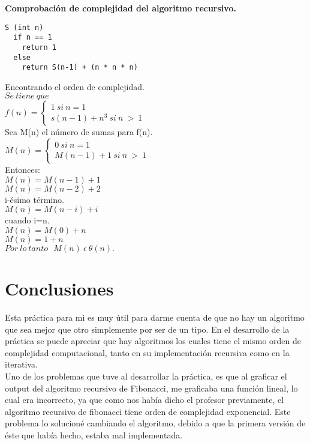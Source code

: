 \documentclass[12pt]{report}
\begin{document}
	\textbf{Comprobación de complejidad del algoritmo recursivo.} \\
	\lstset{language=C, breaklines=true, basicstyle=\footnotesize}
	\lstset{numbers=left, numberstyle=\tiny, stepnumber=1, numbersep=10pt}
	\begin{lstlisting}
S (int n)
  if n == 1
    return 1
  else
    return S(n-1) + (n * n * n)
	\end{lstlisting}

	Encontrando el orden de complejidad.\\		
	$Se \ tiene \ que$\\
	
	 $f(n) = \left \{ \begin{array}{c} 1 \ si \ n=1 \\ s(n-1)+n^{3} \ si \ n \ > \ 1 \end{array}\right.$\\
	 
	Sea M(n) el número de sumas para f(n).\\
	
	 $M(n) = \left \{ \begin{array}{c} 0 \ si \ n=1 \\ M(n-1)+1 \ si \ n \ > \ 1 \end{array}\right.$\\
	 
	 Entonces:\\
	$M(n)=M(n-1)+1$\\
	$M(n)=M(n-2)+2$\\
	i-ésimo término.\\
	$M(n)=M(n-i)+i$\\
	cuando i=n.\\
	$M(n)=M(0)+n$\\
	$M(n)=1+n$\\
	
	$Por \ lo \ tanto \ \ \ M(n) \ \epsilon \ \theta (n).$\newpage
	
	\section{Conclusiones}
	Esta práctica para mi es muy útil para darme cuenta de que no hay un algoritmo que sea mejor que otro simplemente por ser de un tipo. En el desarrollo de la práctica se puede apreciar que hay algoritmos los cuales tiene el mismo orden de complejidad computacional, tanto en su implementación recursiva como en la iterativa.\\
	Uno de los problemas que tuve al desarrollar la práctica, es que al graficar el output del algoritmo recursivo de Fibonacci, me graficaba una función lineal, lo cual era incorrecto, ya que como nos había dicho el profesor previamente, el algoritmo recursivo de fibonacci tiene orden de complejidad exponencial. Este problema lo solucioné cambiando el algoritmo, debido a que la primera versión de éste que había hecho, estaba mal implementada.
	
\end{document}
